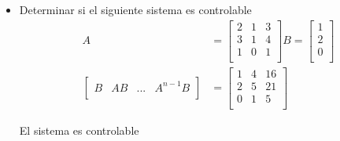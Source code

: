 \documentclass[12pt]{article}
\begin{document}
\begin{itemize}
    \item Determinar si el siguiente sistema  es controlable
    \begin{equation}
        \begin{split}
            A&=
            \begin{bmatrix}
                2 & 1 & 3 \\
                3 & 1 & 4 \\
                1 & 0 & 1 \\
            \end{bmatrix}
            B=
            \begin{bmatrix}
                1 \\
                2 \\
                0 \\
            \end{bmatrix}\\
            \begin{bmatrix}
                B & AB & ... & A^{n-1}B \\
            \end{bmatrix}&=
            \begin{bmatrix}
                1 & 4 & 16 \\
                2 & 5 & 21 \\
                0 & 1 & 5 \\
            \end{bmatrix}
        \end{split}
        \label{eq:controla1}
    \end{equation}

    El sistema es controlable


\end{itemize}
\end{document}
